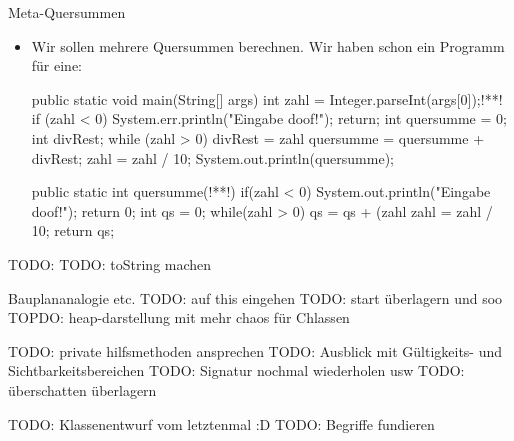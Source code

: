\begin{frame}[fragile]{Meta-Quersummen}
\begin{itemize}[<+(1)->]
    \item Wir sollen mehrere Quersummen berechnen. Wir haben schon ein Programm für eine:\vfill{}
\columns[onlytextwidth,c]
\begin{plainjava}
public static void main(String[] args) {
   int zahl = Integer.parseInt(args[0]);!**!
   if (zahl < 0) {
      System.err.println("Eingabe doof!");
      return;
   }
   int quersumme = 0;
   int divRest;
   while (zahl > 0) {
      divRest = zahl %
      quersumme = quersumme + divRest;
      zahl = zahl / 10;
   }
   System.out.println(quersumme);
}
\end{plainjava}
\column{0pt}
\clap{$\to$}
\makeatletter
{}
\begin{plainjava}
public static int quersumme(!**!){
    if(zahl < 0){
        System.out.println("Eingabe doof!");
        return 0;
    }
    int qs = 0;
    while(zahl > 0){
        qs = qs + (zahl %
        zahl = zahl / 10;
    }
    return qs;
}
\end{plainjava}
\endcolumns
\end{itemize}
\end{frame}

\begin{frame}{TODO:}
    TODO: toString machen

    Bauplananalogie etc.
    TODO: auf this eingehen TODO: start überlagern  und soo
    TOPDO: heap-darstellung mit mehr chaos für Chlassen

    TODO: private hilfsmethoden ansprechen
    TODO: Ausblick mit Gültigkeits- und Sichtbarkeitsbereichen
    TODO: Signatur nochmal wiederholen usw
    TODO: überschatten überlagern

    TODO: Klassenentwurf vom letztenmal :D
    TODO: Begriffe fundieren
\end{frame}
